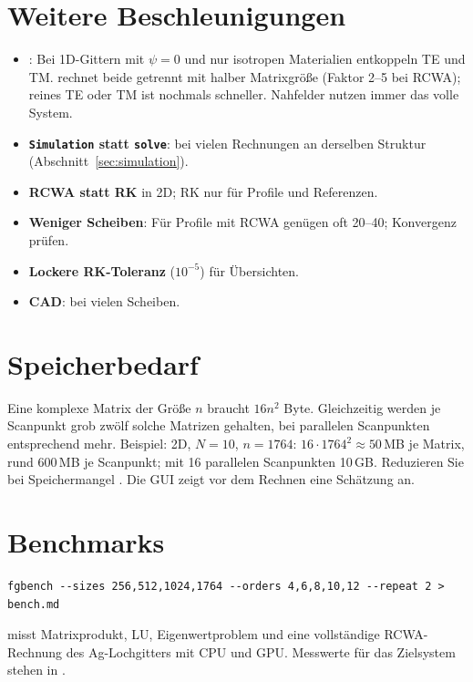 \section{Weitere Beschleunigungen}
\begin{itemize}
  \item \textbf{}: Bei 1D-Gittern mit $\psi=0$ und nur isotropen Materialien entkoppeln TE
        und TM.  rechnet beide getrennt mit halber Matrixgröße (Faktor 2--5 bei RCWA); reines TE oder TM ist
        nochmals schneller. Nahfelder nutzen immer das volle System.
  \item \textbf{\texttt{Simulation} statt \texttt{solve}}: bei vielen Rechnungen an derselben Struktur
        (Abschnitt~\ref{sec:simulation}).
  \item \textbf{RCWA statt RK} in 2D; RK nur für Profile und Referenzen.
  \item \textbf{Weniger Scheiben}: Für Profile mit RCWA genügen oft 20--40; Konvergenz prüfen.
  \item \textbf{Lockere RK-Toleranz} ($10^{-5}$) für Übersichten.
  \item \textbf{CAD}:  bei vielen Scheiben.
\end{itemize}

\section{Speicherbedarf}
%
Eine komplexe Matrix der Größe $n$ braucht $16n^2$ Byte. Gleichzeitig werden je Scanpunkt grob zwölf solche
Matrizen gehalten, bei parallelen Scanpunkten entsprechend mehr. Beispiel: 2D, $N=10$, $n=1764$: $16\cdot1764^2
\approx50$\,MB je Matrix, rund 600\,MB je Scanpunkt; mit 16 parallelen Scanpunkten 10\,GB. Reduzieren Sie bei
Speichermangel . Die GUI zeigt vor dem Rechnen eine Schätzung an.

\section{Benchmarks}
%
\begin{lstlisting}[style=shell]
fgbench --sizes 256,512,1024,1764 --orders 4,6,8,10,12 --repeat 2 > bench.md
\end{lstlisting}
 misst Matrixprodukt, LU, Eigenwertproblem und eine vollständige RCWA-Rechnung des Ag-Lochgitters mit
CPU und GPU. Messwerte für das Zielsystem stehen in .
